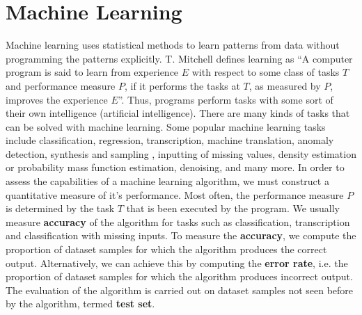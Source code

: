 \documentclass[master]{thesis-uestc}
\begin{document}
\section{Machine Learning}
Machine learning uses statistical methods to learn patterns from data without programming the patterns explicitly. T. Mitchell defines learning as ``A computer program is said to learn from experience $E$ with respect to some class of tasks $T$ and performance measure $P$, if it performs the tasks at $T$, as measured by $P$, improves the experience $E$''. Thus, programs perform tasks with some sort of their own intelligence (artificial intelligence). There are many kinds of tasks that can be solved with machine learning. Some popular machine learning tasks include classification, regression, transcription, machine translation, anomaly detection, synthesis and sampling , inputting of missing values, density estimation or probability mass function estimation, denoising, and many more. In order to assess the capabilities of a machine learning algorithm, we must construct a quantitative measure of it's performance. Most often, the performance measure $P$ is determined by the task $T$ that is been executed by the program. We usually measure \textbf{accuracy} of the algorithm for tasks such as classification, transcription and classification with missing inputs. To measure the \textbf{accuracy}, we compute the proportion of dataset samples for which the algorithm produces the correct output. Alternatively, we can achieve this by computing the \textbf{error rate}, i.e. the proportion of dataset samples for which the algorithm produces incorrect output. The evaluation of the algorithm is carried out on dataset samples not seen before by the algorithm, termed \textbf{test set}.
\end{document}
